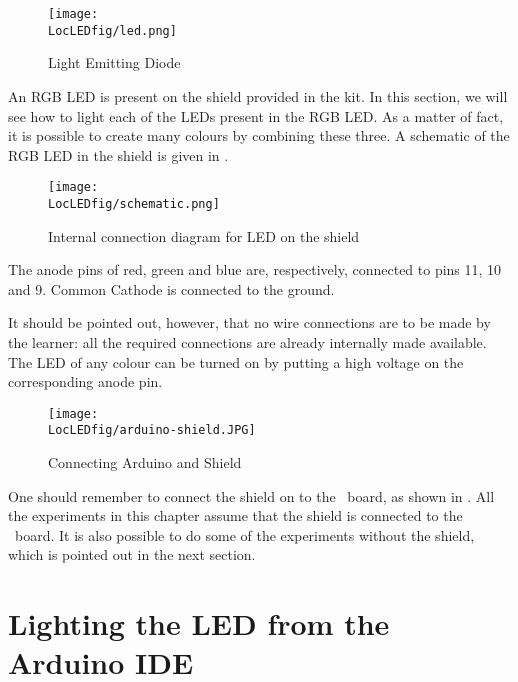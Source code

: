 \begin{figure}
\centering
\texttt{[image: \\LocLEDfig/led.png]}
\caption{Light Emitting Diode}
\label{fig:ledsym}
\end{figure}

An RGB LED is present on the shield provided in the kit.  In this
section, we will see how to light each of the LEDs present in the RGB
LED.  As a matter of fact, it is possible to create many colours by
combining these three.  A schematic of the RGB LED in the shield is
given in .
\begin{figure}
\centering
\texttt{[image: \\LocLEDfig/schematic.png]}
\caption{Internal connection diagram for LED on the shield}
\label{fig:ledblock}
\end{figure}
The anode pins of red, green and blue are, respectively, connected to
pins 11, 10 and 9.  Common Cathode is connected to the ground.

It should be pointed out, however, that no wire connections are to be
made by the learner: all the required connections are already
internally made available.  The LED of any colour can be turned on by
putting a high voltage on the corresponding anode pin.

\begin{figure}
\centering
\texttt{[image: \\LocLEDfig/arduino-shield.JPG]}
\caption{Connecting Arduino and Shield}
\label{fig:uno-shield-connect}
\end{figure}

One should remember to connect the shield on to the \arduino\ board, as
shown in . All the experiments in this
chapter assume that the shield is connected to the \arduino\ board.
It is also possible to do some of the experiments without the shield,
which is pointed out in the next section.


\section{Lighting the LED from the Arduino IDE}

